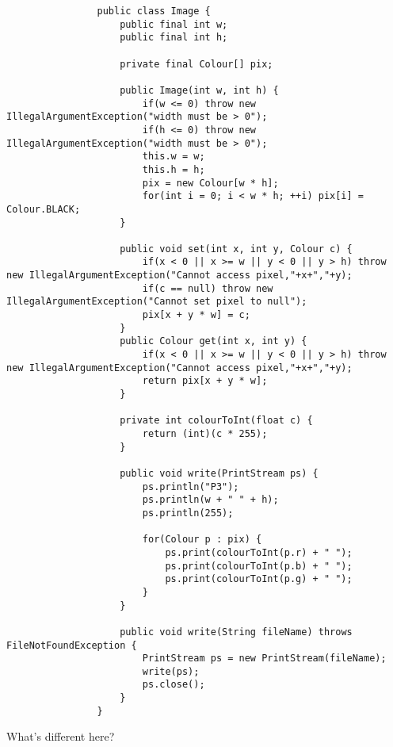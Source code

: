 \documentclass{article}
\begin{document}
            \begin{verbatim}
                public class Image {
                    public final int w;
                    public final int h;

                    private final Colour[] pix;

                    public Image(int w, int h) {
                        if(w <= 0) throw new IllegalArgumentException("width must be > 0");
                        if(h <= 0) throw new IllegalArgumentException("width must be > 0");
                        this.w = w;
                        this.h = h;
                        pix = new Colour[w * h];
                        for(int i = 0; i < w * h; ++i) pix[i] = Colour.BLACK;
                    }

                    public void set(int x, int y, Colour c) {
                        if(x < 0 || x >= w || y < 0 || y > h) throw new IllegalArgumentException("Cannot access pixel,"+x+","+y);
                        if(c == null) throw new IllegalArgumentException("Cannot set pixel to null");
                        pix[x + y * w] = c;
                    }
                    public Colour get(int x, int y) {
                        if(x < 0 || x >= w || y < 0 || y > h) throw new IllegalArgumentException("Cannot access pixel,"+x+","+y);
                        return pix[x + y * w];
                    }

                    private int colourToInt(float c) {
                        return (int)(c * 255);
                    }

                    public void write(PrintStream ps) {
                        ps.println("P3");
                        ps.println(w + " " + h);
                        ps.println(255);
        
                        for(Colour p : pix) {
                            ps.print(colourToInt(p.r) + " ");
                            ps.print(colourToInt(p.b) + " ");
                            ps.print(colourToInt(p.g) + " ");
                        }
                    }
    
                    public void write(String fileName) throws FileNotFoundException {
                        PrintStream ps = new PrintStream(fileName);
                        write(ps);
                        ps.close();
                    }
                }
            \end{verbatim}
        
            What's different here? 
            
\end{document}
